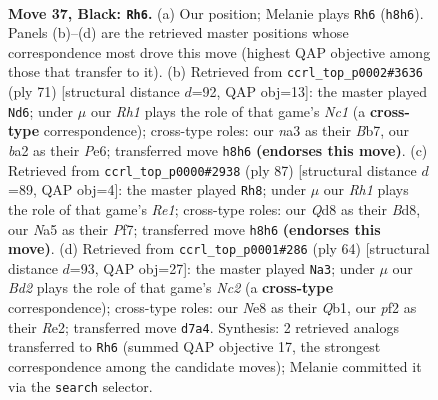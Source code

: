 \documentclass[11pt]{article}
\begin{document}
\clearpage

\begin{figure}[p]\centering
\begin{subfigure}{0.46\textwidth}\centering
\resizebox{\linewidth}{!}{%
\newchessgame
\chessboard[
  setfen={3qn2r/3b2k1/p4p2/n3P2p/PQ1P2p1/N7/B4PPP/R3K1N1 b - - 0 37},
  showmover=false,
  pgfstyle=straightmove, color=movearrow, markmove={h8-h6}
]}
\caption{}
\end{subfigure}\hfill
\begin{subfigure}{0.46\textwidth}\centering
\resizebox{\linewidth}{!}{%
\newchessgame
\chessboard[
  setfen={2n3k1/1bq2pp1/1p2pn1p/8/1PN5/2NBP2P/5PP1/Q5K1 b - - 11 36},
  showmover=false,
  pgfstyle=straightmove, color=movearrow, markmove={c8-d6}
]}
\caption{}
\end{subfigure}
\\[4pt]
\begin{subfigure}{0.46\textwidth}\centering
\resizebox{\linewidth}{!}{%
\newchessgame
\chessboard[
  setfen={3br3/5pk1/1q1p1n1p/pp1Pp3/8/PNP2P1Q/KP6/3R1B2 b - - 0 44},
  showmover=false,
  pgfstyle=straightmove, color=movearrow, markmove={e8-h8}
]}
\caption{}
\end{subfigure}\hfill
\begin{subfigure}{0.46\textwidth}\centering
\resizebox{\linewidth}{!}{%
\newchessgame
\chessboard[
  setfen={1r4k1/6p1/7p/2pq4/b3Np2/1n1P1P2/1PN1R1PP/1Q4K1 w - - 0 33},
  showmover=false,
  pgfstyle=straightmove, color=movearrow, markmove={c2-a3}
]}
\caption{}
\end{subfigure}
\caption{\textbf{Move 37, Black: \texttt{Rh6}.} (a) Our position; Melanie plays \texttt{Rh6} (\texttt{h8h6}). Panels (b)--(d) are the retrieved master positions whose correspondence most drove this move (highest QAP objective among those that transfer to it). (b) Retrieved from \texttt{ccrl\_top\_p0002\#3636} (ply 71) [structural distance $d$=92, QAP obj=13]: the master played \texttt{Nd6}; under $\mu$ our \emph{Rh1} plays the role of that game's \emph{Nc1} (a \textbf{cross-type} correspondence); cross-type roles: our \emph{n}a3 as their \emph{B}b7, our \emph{b}a2 as their \emph{P}e6; transferred move \texttt{h8h6} \textbf{(endorses this move)}. (c) Retrieved from \texttt{ccrl\_top\_p0000\#2938} (ply 87) [structural distance $d$=89, QAP obj=4]: the master played \texttt{Rh8}; under $\mu$ our \emph{Rh1} plays the role of that game's \emph{Re1}; cross-type roles: our \emph{Q}d8 as their \emph{B}d8, our \emph{N}a5 as their \emph{P}f7; transferred move \texttt{h8h6} \textbf{(endorses this move)}. (d) Retrieved from \texttt{ccrl\_top\_p0001\#286} (ply 64) [structural distance $d$=93, QAP obj=27]: the master played \texttt{Na3}; under $\mu$ our \emph{Bd2} plays the role of that game's \emph{Nc2} (a \textbf{cross-type} correspondence); cross-type roles: our \emph{N}e8 as their \emph{Q}b1, our \emph{p}f2 as their \emph{R}e2; transferred move \texttt{d7a4}. Synthesis: 2 retrieved analogs transferred to \texttt{Rh6} (summed QAP objective 17, the strongest correspondence among the candidate moves); Melanie committed it via the \texttt{search} selector.}
\label{fig:thought-m73}
\end{figure}
\end{document}
